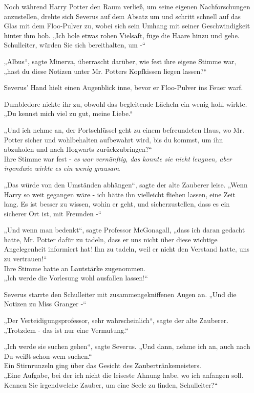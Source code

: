{Noch während Harry Potter den Raum verließ, um seine eigenen Nachforschungen anzustellen, drehte sich Severus auf dem Absatz um und schritt schnell auf das Glas mit dem Floo-Pulver zu, wobei sich sein Umhang mit seiner Geschwindigkeit hinter ihm hob. „Ich hole etwas rohen Vielsaft, füge die Haare hinzu und gehe. Schulleiter, würden Sie sich bereithalten, um -“

„Albus“, sagte Minerva, überrascht darüber, wie fest ihre eigene Stimme war, „hast du diese Notizen unter Mr. Potters Kopfkissen liegen lassen?“

Severus' Hand hielt einen Augenblick inne, bevor er Floo-Pulver ins Feuer warf.

Dumbledore nickte ihr zu, obwohl das begleitende Lächeln ein wenig hohl wirkte. „Du kennst mich viel zu gut, meine Liebe.“

„Und ich nehme an, der Portschlüssel geht zu einem befreundeten Haus, wo Mr. Potter sicher und wohlbehalten aufbewahrt wird, bis du kommst, um ihn abzuholen und nach Hogwarts zurückzubringen?“\\ Ihre Stimme war fest - \emph{es war vernünftig, das konnte sie nicht leugnen, aber irgendwie wirkte es ein wenig grausam}.

„Das würde von den Umständen abhängen“, sagte der alte Zauberer leise. „Wenn Harry so weit gegangen wäre - ich hätte ihn vielleicht fliehen lassen, eine Zeit lang. Es ist besser zu wissen, wohin er geht, und sicherzustellen, dass es ein sicherer Ort ist, mit Freunden -“

„Und wenn man bedenkt“, sagte Professor McGonagall, „dass ich daran gedacht hatte, Mr. Potter dafür zu tadeln, dass er uns nicht über diese wichtige Angelegenheit informiert hat! Ihn zu tadeln, weil er nicht den Verstand hatte, uns zu vertrauen!“\\ Ihre Stimme hatte an Lautstärke zugenommen.\\ „Ich werde die Vorlesung wohl ausfallen lassen!“

Severus starrte den Schulleiter mit zusammengekniffenen Augen an. „Und die Notizen zu Miss Granger -“

„Der Verteidigungsprofessor, sehr wahrscheinlich“, sagte der alte Zauberer. „Trotzdem - das ist nur eine Vermutung.“

„Ich werde sie suchen gehen“, sagte Severus. „Und dann, nehme ich an, auch nach Du-weißt-schon-wem suchen.“\\ Ein Stirnrunzeln ging über das Gesicht des Zaubertränkemeisters.\\ „Eine Aufgabe, bei der ich nicht die leiseste Ahnung habe, wo ich anfangen soll. Kennen Sie irgendwelche Zauber, um eine Seele zu finden, Schulleiter?“

}
